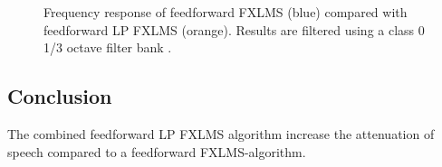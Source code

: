 \begin{figure}[H]
	\centering
	
	\caption{Frequency response of feedforward FXLMS (blue) compared with feedforward LP FXLMS (orange). Results are filtered using a class 0 1/3 octave filter bank \cite{OctaveBand}.}
	\label{fig:ANCcompareALLAppendix}
\end{figure}


\subsection{Conclusion}
The combined feedforward LP FXLMS algorithm increase the attenuation of speech compared to a feedforward FXLMS-algorithm. 
